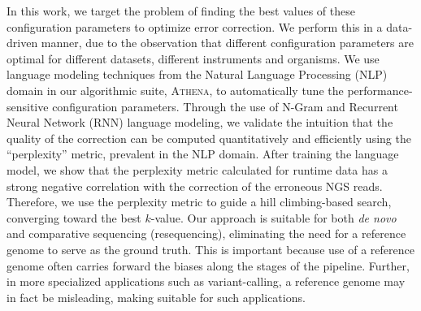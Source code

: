  In this work, we target the problem of finding the best values of these configuration parameters to optimize error correction.
We perform this in a data-driven manner, due to the observation that different configuration parameters are optimal for different datasets, \ie different instruments and organisms. 
We use language modeling techniques from the Natural Language Processing (NLP) domain in our algorithmic suite, \textsc{Athena}, to automatically tune the performance-sensitive configuration parameters. Through the use of N-Gram and Recurrent Neural Network (RNN) language modeling, we validate the intuition that the quality of the correction can be computed quantitatively and efficiently using the ``perplexity'' metric, prevalent in the NLP domain. After training the language model, we show that the perplexity metric calculated for runtime data has a strong negative correlation with the correction of the erroneous NGS reads. Therefore, we use the perplexity metric to guide a hill climbing-based search, converging toward the best $k$-value. Our approach is suitable for both \textit{de novo} and comparative sequencing (resequencing), eliminating the need for a reference genome to serve as the ground truth. This is important because use of a reference genome often carries forward the biases along the stages of the pipeline. Further, in more specialized applications such as variant-calling, a reference genome may in fact be misleading, making \name suitable for such applications. %
